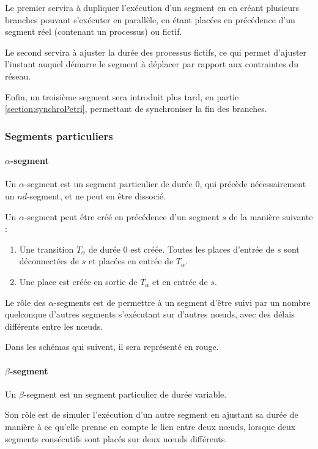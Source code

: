 Le premier servira à dupliquer l'exécution d'un segment en en créant plusieurs branches pouvant s'exécuter en parallèle, en étant placées en précédence d'un segment réel (contenant un processus) ou fictif.

Le second servira à ajuster la durée des processus fictifs, ce qui permet d'ajuster l'instant auquel démarre le segment à déplacer par rapport aux contraintes du réseau.

Enfin, un troisième segment sera introduit plus tard, en partie \ref{section:synchroPetri}, permettant de synchroniser la fin des branches.

\subsubsection{Segments particuliers}
\paragraph{$\alpha$-segment}
\label{section:alphasegment}
\begin{mydef}
Un $\alpha$-segment est un segment particulier de durée $0$, qui précède nécessairement un $nd$-segment, et ne peut en être dissocié.
\end{mydef}
Un $\alpha$-segment peut être créé en précédence d'un segment $s$ de la manière suivante : 
\begin{enumerate}
\item Une transition $T_\alpha$ de durée 0 est créée. Toutes les places d'entrée de $s$ sont déconnectées de $s$ et placées en entrée de $T_\alpha$.
\item Une place est créée en sortie de $T_\alpha$ et en entrée de $s$. 
\end{enumerate}

Le rôle des $\alpha$-segments est de permettre à un segment d'être suivi par un nombre quelconque d'autres segments s'exécutant sur d'autres nœuds, avec des délais différents entre les nœuds.

Dans les schémas qui suivent, il sera représenté en \textcolor{BrickRed}{rouge}.

\paragraph{$\beta$-segment}
Un $\beta$-segment est un segment particulier de durée variable.

Son rôle est de simuler l'exécution d'un autre segment en ajustant sa durée de manière à ce qu'elle prenne en compte le lien entre deux nœuds, lorsque deux segments consécutifs sont placés sur deux nœuds différents.

